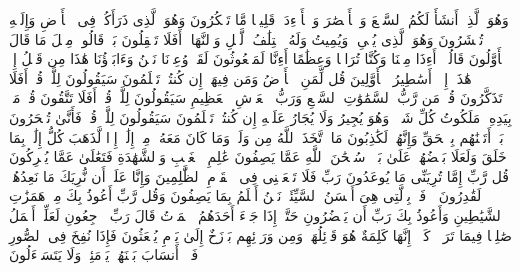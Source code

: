 \startbuffer[\q:23:78]
وَهُوَ ٱلَّذِیۤ أَنشَأَ لَكُمُ ٱلسَّمۡعَ وَٱلۡأَبۡصَٰرَ وَٱلۡأَفۡءِدَةَۚ قَلِیلࣰا مَّا تَشۡكُرُونَ%
\stopbuffer%
\startbuffer[\q:23:79]
وَهُوَ ٱلَّذِی ذَرَأَكُمۡ فِی ٱلۡأَرۡضِ وَإِلَیۡهِ تُحۡشَرُونَ%
\stopbuffer%
\startbuffer[\q:23:80]
وَهُوَ ٱلَّذِی یُحۡیِۦ وَیُمِیتُ وَلَهُ ٱخۡتِلَٰفُ ٱلَّیۡلِ وَٱلنَّهَارِۚ أَفَلَا تَعۡقِلُونَ%
\stopbuffer%
\startbuffer[\q:23:81]
بَلۡ قَالُوا۟ مِثۡلَ مَا قَالَ ٱلۡأَوَّلُونَ%
\stopbuffer%
\startbuffer[\q:23:82]
قَالُوۤا۟ أَءِذَا مِتۡنَا وَكُنَّا تُرَابࣰا وَعِظَٰمًا أَءِنَّا لَمَبۡعُوثُونَ%
\stopbuffer%
\startbuffer[\q:23:83]
لَقَدۡ وُعِدۡنَا نَحۡنُ وَءَابَاۤؤُنَا هَٰذَا مِن قَبۡلُ إِنۡ هَٰذَاۤ إِلَّاۤ أَسَٰطِیرُ ٱلۡأَوَّلِینَ%
\stopbuffer%
\startbuffer[\q:23:84]
قُل لِّمَنِ ٱلۡأَرۡضُ وَمَن فِیهَاۤ إِن كُنتُمۡ تَعۡلَمُونَ%
\stopbuffer%
\startbuffer[\q:23:85]
سَیَقُولُونَ لِلَّهِۚ قُلۡ أَفَلَا تَذَكَّرُونَ%
\stopbuffer%
\startbuffer[\q:23:86]
قُلۡ مَن رَّبُّ ٱلسَّمَٰوَٰتِ ٱلسَّبۡعِ وَرَبُّ ٱلۡعَرۡشِ ٱلۡعَظِیمِ%
\stopbuffer%
\startbuffer[\q:23:87]
سَیَقُولُونَ لِلَّهِۚ قُلۡ أَفَلَا تَتَّقُونَ%
\stopbuffer%
\startbuffer[\q:23:88]
قُلۡ مَنۢ بِیَدِهِۦ مَلَكُوتُ كُلِّ شَیۡءࣲ وَهُوَ یُجِیرُ وَلَا یُجَارُ عَلَیۡهِ إِن كُنتُمۡ تَعۡلَمُونَ%
\stopbuffer%
\startbuffer[\q:23:89]
سَیَقُولُونَ لِلَّهِۚ قُلۡ فَأَنَّىٰ تُسۡحَرُونَ%
\stopbuffer%
\startbuffer[\q:23:90]
بَلۡ أَتَیۡنَٰهُم بِٱلۡحَقِّ وَإِنَّهُمۡ لَكَٰذِبُونَ%
\stopbuffer%
\startbuffer[\q:23:91]
مَا ٱتَّخَذَ ٱللَّهُ مِن وَلَدࣲ وَمَا كَانَ مَعَهُۥ مِنۡ إِلَٰهٍۚ إِذࣰا لَّذَهَبَ كُلُّ إِلَٰهِۭ بِمَا خَلَقَ وَلَعَلَا بَعۡضُهُمۡ عَلَىٰ بَعۡضࣲۚ سُبۡحَٰنَ ٱللَّهِ عَمَّا یَصِفُونَ%
\stopbuffer%
\startbuffer[\q:23:92]
عَٰلِمِ ٱلۡغَیۡبِ وَٱلشَّهَٰدَةِ فَتَعَٰلَىٰ عَمَّا یُشۡرِكُونَ%
\stopbuffer%
\startbuffer[\q:23:93]
قُل رَّبِّ إِمَّا تُرِیَنِّی مَا یُوعَدُونَ%
\stopbuffer%
\startbuffer[\q:23:94]
رَبِّ فَلَا تَجۡعَلۡنِی فِی ٱلۡقَوۡمِ ٱلظَّٰلِمِینَ%
\stopbuffer%
\startbuffer[\q:23:95]
وَإِنَّا عَلَىٰۤ أَن نُّرِیَكَ مَا نَعِدُهُمۡ لَقَٰدِرُونَ%
\stopbuffer%
\startbuffer[\q:23:96]
ٱدۡفَعۡ بِٱلَّتِی هِیَ أَحۡسَنُ ٱلسَّیِّئَةَۚ نَحۡنُ أَعۡلَمُ بِمَا یَصِفُونَ%
\stopbuffer%
\startbuffer[\q:23:97]
وَقُل رَّبِّ أَعُوذُ بِكَ مِنۡ هَمَزَٰتِ ٱلشَّیَٰطِینِ%
\stopbuffer%
\startbuffer[\q:23:98]
وَأَعُوذُ بِكَ رَبِّ أَن یَحۡضُرُونِ%
\stopbuffer%
\startbuffer[\q:23:99]
حَتَّىٰۤ إِذَا جَاۤءَ أَحَدَهُمُ ٱلۡمَوۡتُ قَالَ رَبِّ ٱرۡجِعُونِ%
\stopbuffer%
\startbuffer[\q:23:100]
لَعَلِّیۤ أَعۡمَلُ صَٰلِحࣰا فِیمَا تَرَكۡتُۚ كَلَّاۤۚ إِنَّهَا كَلِمَةٌ هُوَ قَاۤئِلُهَاۖ وَمِن وَرَاۤئِهِم بَرۡزَخٌ إِلَىٰ یَوۡمِ یُبۡعَثُونَ%
\stopbuffer%
\startbuffer[\q:23:101]
فَإِذَا نُفِخَ فِی ٱلصُّورِ فَلَاۤ أَنسَابَ بَیۡنَهُمۡ یَوۡمَئِذࣲ وَلَا یَتَسَاۤءَلُونَ%
